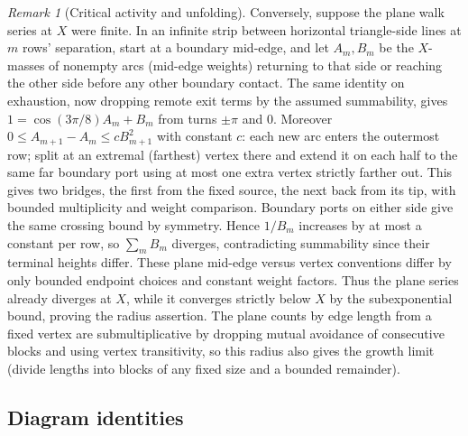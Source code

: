 \documentclass[11pt]{article}
\numberwithin{equation}{section}
\theoremstyle{definition}\newtheorem{definition}[theorem]{Definition}
\theoremstyle{remark}\newtheorem{remark}[theorem]{Remark}
\begin{document}
\begin{remark}[Critical activity and unfolding]
Conversely, suppose the plane walk series at \(X\) were finite. In an infinite strip between horizontal triangle-side lines at \(m\) rows' separation, start at a boundary mid-edge, and let \(A_m,B_m\) be the \(X\)-masses of nonempty arcs (mid-edge weights) returning to that side or reaching the other side before any other boundary contact. The same identity on exhaustion, now dropping remote exit terms by the assumed summability, gives \(1=\cos(3\pi/8)A_m+B_m\) from turns \(\pm\pi\) and 0. Moreover \(0\le A_{m+1}-A_m\le c B_{m+1}^2\) with constant \(c\): each new arc enters the outermost row; split at an extremal (farthest) vertex there and extend it on each half to the same far boundary port using at most one extra vertex strictly farther out. This gives two bridges, the first from the fixed source, the next back from its tip, with bounded multiplicity and weight comparison. Boundary ports on either side give the same crossing bound by symmetry. Hence \(1/B_m\) increases by at most a constant per row, so \(\sum_m B_m\) diverges, contradicting summability since their terminal heights differ. These plane mid-edge versus vertex conventions differ by only bounded endpoint choices and constant weight factors. Thus the plane series already diverges at \(X\), while it converges strictly below \(X\) by the subexponential bound, proving the radius assertion. The plane counts by edge length from a fixed vertex are submultiplicative by dropping mutual avoidance of consecutive blocks and using vertex transitivity, so this radius also gives the growth limit (divide lengths into blocks of any fixed size and a bounded remainder).

\end{remark}

\subsection{Diagram identities}\label{L:step1}
\end{document}
